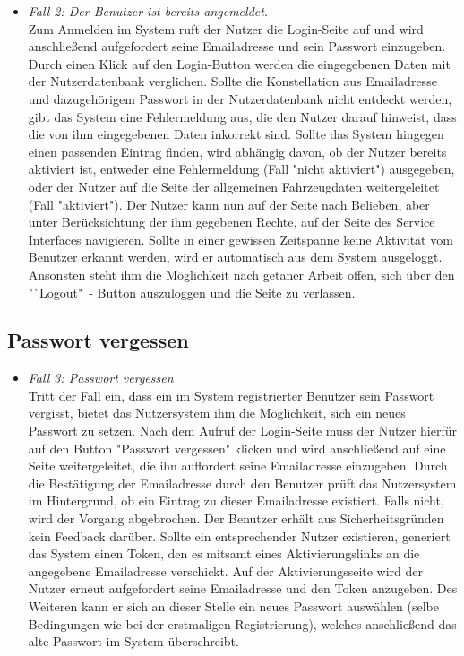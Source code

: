 \documentclass[fontsize = 12pt, paper = a4]{scrreprt}
\begin{document}
\begin{itemize}

\item \textit{Fall 2: Der Benutzer ist bereits angemeldet.} \\ 
Zum Anmelden im System ruft der Nutzer die Login-Seite auf und wird anschließend aufgefordert seine Emailadresse und sein Passwort einzugeben. Durch einen Klick auf den Login-Button werden die eingegebenen Daten mit der Nutzerdatenbank verglichen. Sollte die Konstellation aus Emailadresse und dazugehörigem Passwort in der Nutzerdatenbank nicht entdeckt werden, gibt das System eine Fehlermeldung aus, die den Nutzer darauf hinweist, dass die von ihm eingegebenen Daten inkorrekt sind. Sollte das System hingegen einen passenden Eintrag finden, wird abhängig davon, ob der Nutzer bereits aktiviert ist, entweder eine Fehlermeldung (Fall "nicht aktiviert") ausgegeben, oder der Nutzer auf die Seite der allgemeinen Fahrzeugdaten weitergeleitet (Fall "aktiviert"). Der Nutzer kann nun auf der Seite nach Belieben, aber unter Berücksichtung der ihm gegebenen Rechte, auf der Seite des Service Interfaces navigieren.
Sollte in einer gewissen Zeitspanne keine Aktivität vom Benutzer erkannt werden, wird er automatisch aus dem System ausgeloggt.
Ansonsten steht ihm die Möglichkeit nach getaner Arbeit offen, sich über den "`Logout"\ - Button auszuloggen und die Seite zu verlassen.

\end{itemize}

\subsection{Passwort vergessen}

\begin{itemize}

\item \textit{Fall 3: Passwort vergessen} \\
Tritt der Fall ein, dass ein im System registrierter Benutzer sein Passwort vergisst, bietet das Nutzersystem ihm die Möglichkeit, sich ein neues Passwort zu setzen. Nach dem Aufruf der Login-Seite muss der Nutzer hierfür auf den Button "Passwort vergessen" klicken und wird anschließend auf eine Seite weitergeleitet, die ihn auffordert seine Emailadresse einzugeben. Durch die Bestätigung der Emailadresse durch den Benutzer prüft das Nutzersystem im Hintergrund, ob ein Eintrag zu dieser Emailadresse existiert. Falls nicht, wird der Vorgang abgebrochen. Der Benutzer erhält aus Sicherheitsgründen kein Feedback darüber. Sollte ein entsprechender Nutzer existieren, generiert das System einen Token, den es mitsamt eines Aktivierungslinks an die angegebene Emailadresse verschickt. Auf der Aktivierungsseite wird der Nutzer erneut aufgefordert seine Emailadresse und den Token anzugeben. Des Weiteren kann er sich an dieser Stelle ein neues Passwort auswählen (selbe Bedingungen wie bei der erstmaligen Registrierung), welches anschließend das alte Passwort im System überschreibt.

\end{itemize}
\end{document}

